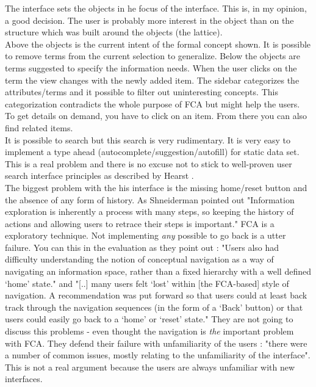 \documentclass[11pt]{report}
\begin{document}
 The interface sets the objects in he focus of the interface. This is, in my opinion, a good decision. The user is probably more interest in the object than on the structure which was built around the objects (the lattice). \\
 
 Above the objects is the current intent of the formal concept shown. It is possible to remove terms from the current selection to generalize. Below the objects are terms suggested to specify the information needs. When the user clicks on the term the view changes with the newly added item. The sidebar categorizes the attributes/terms and it possible to filter out uninteresting concepts. This categorization contradicts the whole purpose of FCA but might help the users. \\
 
 To get details on demand, you have to click on an item. From there you can also find related items. \\
 
 It is possible to search but this search is very rudimentary. It is very easy to implement a type ahead (autocomplete/suggestion/autofill) for static data set. This is a real problem and there is no excuse not to stick to well-proven user search interface principles as described by Hearst \cite{Hearst2009}. \\
 
 The biggest problem with the his interface is the missing home/reset button and the absence of any form of history. As Shneiderman \cite{Shneiderman1996} pointed out "Information exploration is inherently a process with many steps, so keeping the history of actions and allowing users to retrace their steps is important." FCA is a exploratory technique. Not implementing \textit{any} possible to go back is a utter failure. You can this in the evaluation as they point out \cite{Eklund2012}: "Users also had difficulty understanding the notion of conceptual navigation as a way of navigating an information space, rather than a fixed hierarchy with a well defined ‘home’ state." and "[..] many users felt ‘lost’ within [the FCA-based] style of navigation. A recommendation was put forward so that users could at least back track through the navigation sequences (in the form of a ‘Back’ button) or that users could easily go back to a ‘home’ or ‘reset’ state." They are not going to discuss this problems - even thought the navigation is \textit{the} important problem with FCA. They defend their failure with unfamiliarity of the users \cite{Eklund2012}: "there were a number of common issues, mostly relating to the unfamiliarity of the interface". This is not a real argument because the users are always unfamiliar with new interfaces. \\
 
\end{document}
